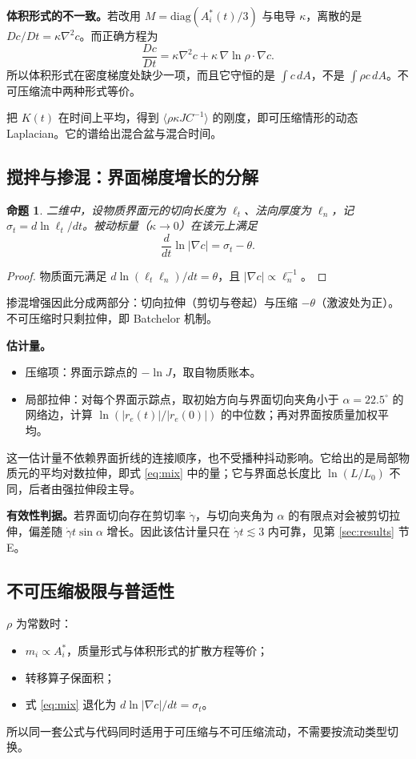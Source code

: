 \documentclass[10.5pt,a4paper]{article}
\newtheorem{prop}{命题}\renewcommand{\proofname}{证明}
\begin{document}
\textbf{体积形式的不一致。}若改用 $M=\mathrm{diag}(A^*_i(t)/3)$ 与电导 $\kappa$，离散的是 $Dc/Dt=\kappa\nabla^2c$。而正确方程为
\[
\frac{Dc}{Dt}=\kappa\nabla^2c+\kappa\,\nabla\ln\rho\cdot\nabla c .
\]
所以体积形式在密度梯度处缺少一项，而且它守恒的是 $\int c\,dA$，不是 $\int\rho c\,dA$。不可压缩流中两种形式等价。

把 $K(t)$ 在时间上平均，得到 $\langle\rho\kappa JC^{-1}\rangle$ 的刚度，即可压缩情形的动态 Laplacian。它的谱给出混合盆与混合时间。

\subsection{搅拌与掺混：界面梯度增长的分解}
\begin{prop}
二维中，设物质界面元的切向长度为 $\ell_t$、法向厚度为 $\ell_n$，记 $\sigma_t=d\ln\ell_t/dt$。被动标量（$\kappa\to0$）在该元上满足
\begin{equation}
\frac{d}{dt}\ln|\nabla c|=\sigma_t-\theta .\label{eq:mix}
\end{equation}
\end{prop}
\begin{proof}
物质面元满足 $d\ln(\ell_t\ell_n)/dt=\theta$，且 $|\nabla c|\propto\ell_n^{-1}$。
\end{proof}
掺混增强因此分成两部分：切向拉伸（剪切与卷起）与压缩 $-\theta$（激波处为正）。不可压缩时只剩拉伸，即 Batchelor 机制。

\textbf{估计量。}
\begin{itemize}
\item 压缩项：界面示踪点的 $-\ln J$，取自物质账本。
\item 局部拉伸：对每个界面示踪点，取初始方向与界面切向夹角小于 $\alpha=22.5^\circ$ 的网络边，计算 $\ln(|r_e(t)|/|r_e(0)|)$ 的中位数；再对界面按质量加权平均。
\end{itemize}
这一估计量不依赖界面折线的连接顺序，也不受播种抖动影响。它给出的是局部物质元的平均对数拉伸，即式 \eqref{eq:mix} 中的量；它与界面总长度比 $\ln(L/L_0)$ 不同，后者由强拉伸段主导。

\textbf{有效性判据。}若界面切向存在剪切率 $\dot\gamma$，与切向夹角为 $\alpha$ 的有限点对会被剪切拉伸，偏差随 $\dot\gamma t\sin\alpha$ 增长。因此该估计量只在 $\dot\gamma t\lesssim3$ 内可靠，见第 \ref{sec:results} 节 E。

\subsection{不可压缩极限与普适性}
$\rho$ 为常数时：
\begin{itemize}
\item $m_i\propto A^*_i$，质量形式与体积形式的扩散方程等价；
\item 转移算子保面积；
\item 式 \eqref{eq:mix} 退化为 $d\ln|\nabla c|/dt=\sigma_t$。
\end{itemize}
所以同一套公式与代码同时适用于可压缩与不可压缩流动，不需要按流动类型切换。
\end{document}
